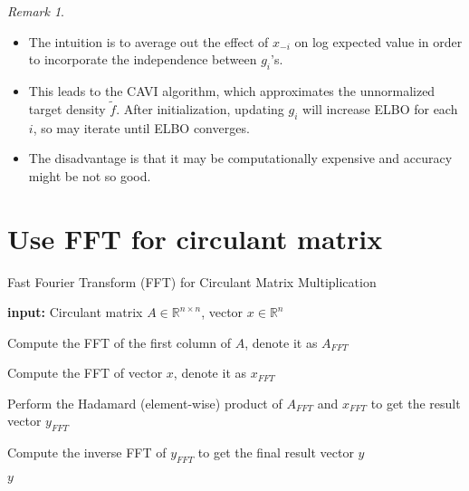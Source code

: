\documentclass{article}
\theoremstyle{remark}
\newtheorem{remark}[example]{Remark}
\begin{document}
\begin{remark}
\begin{itemize}
\item The intuition is to average out the effect of $x_{-i}$ on log expected value in order to incorporate the independence between $g_i$'s. 
\item This leads to the CAVI algorithm, which approximates the unnormalized target density $\tilde{f}$. After initialization, 
updating $g_i$ will increase ELBO for each $i$, so may iterate until ELBO converges.
\item The disadvantage is that it may be computationally expensive and accuracy might be not so good. 
\end{itemize}
\end{remark}

\section*{ Use FFT for circulant matrix}
\begin{algorithm}
    \caption{Fast Fourier Transform (FFT) for Circulant Matrix Multiplication}
    \begin{algorithmic}[1] %
    
    \State \textbf{input:} Circulant matrix $A \in \mathbb{R}^{n \times n}$, vector $x \in \mathbb{R}^n$
        
    \State Compute the FFT of the first column of $A$, denote it as $A_{FFT}$
    
    \State Compute the FFT of vector $x$, denote it as $x_{FFT}$
    
    \State Perform the Hadamard (element-wise) product of $A_{FFT}$ and $x_{FFT}$ to get the result vector $y_{FFT}$
    
    \State Compute the inverse FFT of $y_{FFT}$ to get the final result vector $y$
    
    \State \Return $y$
    
    \end{algorithmic}
    \end{algorithm}
    
\end{document}
